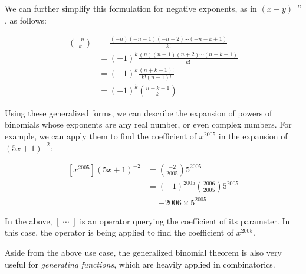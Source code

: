 \documentclass{article}
\begin{document}
We can further simplify this formulation for negative exponents, 
as in $(x+y)^{-n}$, as follows:

\begin{equation*}
\begin{split}
\binom{-n}{k} &= \frac{(-n)(-n-1)(-n-2)\cdots(-n-k+1)}{k!} \\
&= (-1)^k\frac{(n)(n+1)(n+2)\cdots(n+k-1)}{k!} \\ 
&= (-1)^k\frac{(n+k-1)!}{k!(n-1)!} \\
&= (-1)^k\binom{n+k-1}{k}
\end{split}
\end{equation*}

Using these generalized forms, we can describe the expansion of powers 
of binomials whose exponents are any real number, or even complex numbers. 
For example, we can apply them to find the coefficient of $x^{2005}$ in the 
expansion of $( 5x+1)^{-2}$:

\begin{equation*}
\begin{split}
\left[x^{2005}\right](5x+1)^{-2} &= \binom{-2}{2005}5^{2005} \\
&= (-1)^{2005}\binom{2006}{2005}5^{2005} \\
&= -2006 \times 5^{2005}
\end{split}
\end{equation*}

In the above, $\left[\;\cdots\;\right]$ is an operator querying the coefficient 
of its parameter. In this case, the operator is being applied to find the 
coefficient of $x^{2005}$.

Aside from the above use case, the generalized binomial theorem is 
also very useful for \textit{generating functions}, which are heavily 
applied in combinatorics. 
\end{document}
